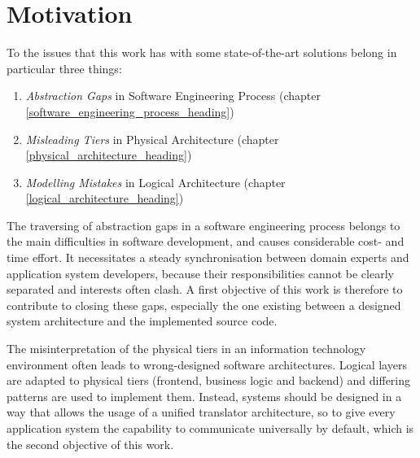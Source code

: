 %
%
%
%
%
%
%

\section{Motivation}
\label{motivation_heading}

To the issues that this work has with some state-of-the-art solutions belong in
particular three things:

\begin{enumerate}
    \item \emph{Abstraction Gaps} in Software Engineering Process (chapter
        \ref{software_engineering_process_heading})
    \item \emph{Misleading Tiers} in Physical Architecture (chapter
        \ref{physical_architecture_heading})
    \item \emph{Modelling Mistakes} in Logical Architecture (chapter
        \ref{logical_architecture_heading})
\end{enumerate}

The traversing of abstraction gaps in a software engineering process belongs to
the main difficulties in software development, and causes considerable cost-
and time effort. It necessitates a steady synchronisation between domain
experts and application system developers, because their responsibilities
cannot be clearly separated and interests often clash. A first objective of
this work is therefore to contribute to closing these gaps, especially the one
existing between a designed system architecture and the implemented source
code.

The misinterpretation of the physical tiers in an information technology
environment often leads to wrong-designed software architectures. Logical
layers are adapted to physical tiers (frontend, business logic and backend) and
differing patterns are used to implement them. Instead, systems should be
designed in a way that allows the usage of a unified translator architecture,
so to give every application system the capability to communicate universally
by default, which is the second objective of this work.


